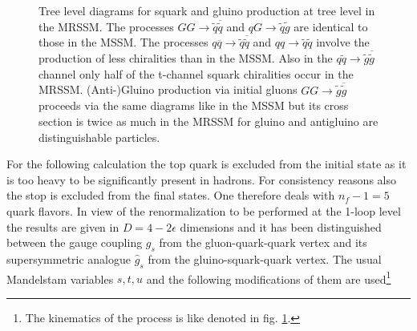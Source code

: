 \begin{figure}[!htbp]
\begin{center}
\caption{Tree level diagrams for squark and gluino production at tree level in the MRSSM. The processes $GG \to \tilde{q}\overline{\tilde{q}}$ and $qG \to \tilde{q}\tilde{g}$ are identical to those in the MSSM. The processes $q\overline{q} \to \tilde{q}\overline{\tilde{q}}$ and $qq \to \tilde{q}\tilde{q}$ involve the production of less chiralities than in the MSSM. Also in the $q\tilde{q} \to \tilde{g}\overline{\tilde{g}}$ channel only half of the t-channel squark chiralities occur in the MRSSM. (Anti-)Gluino production via initial gluons $GG \to \tilde{g}\overline{\tilde{g}}$ proceeds via the same diagrams like in the MSSM but its cross section is twice as much in the MRSSM for gluino and antigluino are distinguishable particles.}\label{fig:TreeDiagrams}
\end{center}
\end{figure}
For the following calculation the top quark is excluded from the initial state as it is too heavy to be significantly present in hadrons. %
For consistency reasons also the stop is excluded from the final states. One therefore deals with $n_f-1 = 5$ quark flavors. In view of the renormalization to be performed at the 1-loop level the results are given in $D = 4 - 2\epsilon$ dimensions and it has been distinguished between the gauge coupling $g_s$ from the gluon-quark-quark vertex and its supersymmetric analogue $\hat{g}_s$ from the gluino-squark-quark vertex. The usual Mandelstam variables $s,t,u$ and the following modifications of them are used\footnote{The kinematics of the process is like denoted in fig. \ref{fig:TreeDiagrams}.}
